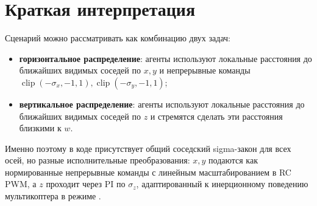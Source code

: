 \documentclass[a4paper,11pt]{article}
\newcommand{\code}[1]{\texttt{\detokenize{#1}}}
\newcommand{\clip}{\operatorname{clip}}
\begin{document}
\section{Краткая интерпретация}

Сценарий можно рассматривать как комбинацию двух задач:
\begin{itemize}
  \item \textbf{горизонтальное распределение}: агенты используют локальные
  расстояния до ближайших видимых соседей по $x,y$ и непрерывные команды
  $\clip(-\sigma_x,-1,1),\clip(-\sigma_y,-1,1)$;
  \item \textbf{вертикальное распределение}: агенты используют локальные
  расстояния до ближайших видимых соседей по $z$ и стремятся сделать эти
  расстояния близкими к $w$.
\end{itemize}

Именно поэтому в коде присутствует общий соседский sigma-закон для всех осей,
но разные исполнительные преобразования: $x,y$ подаются как нормированные
непрерывные команды с линейным масштабированием в RC PWM, а $z$ проходит через PI по $\sigma_z$, адаптированный к
инерционному поведению мультикоптера в режиме \code{POSHOLD}.
\end{document}
